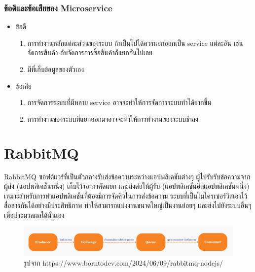 \subsubsection{ข้อดีและข้อเสียของ Microservice}
\begin{itemize}
  \item ข้อดี
  \begin{enumerate}
    \item การทำงานหลักแต่ละส่วนของระบบ ถ้าเป็นไปได้ควรแยกออกเป็น service แต่ละอัน เช่นจัดการสินค้า กับจัดการการซื้อสินค้าก็แยกกันไปเลย
    \item มีที่เก็บข้อมูลของตัวเอง
  \end{enumerate}
  \item ข้อเสีย
  \begin{enumerate}
    \item การจัดการระบบที่มีหลาย service อาจจะทำให้การจัดการระบบทำได้ยากขึ้น
    \item การทำงานของระบบที่แยกออกมาอาจจะทำให้การทำงานของระบบช้าลง
  \end{enumerate}
\end{itemize}
\clearpage
\section{RabbitMQ}
\hspace{1.27cm}RabbitMQ \cite{rabbitmq}ซอฟต์แวร์ที่เป็นตัวกลางรับส่งข้อความระหว่างแอปพลิเคชันต่างๆ ผู้ไปรับรับข้อความจากผู้ส่ง (แอปพลิเคชันหนึ่ง) เก็บไว้รอการคัดแยก และส่งต่อให้ผู้รับ (แอปพลิเคชันอีกแอปพลิเคชันหนึ่ง) เหมาะสำหรับการทำแอปพลิเคชันที่ต้องมีการจัดคิวในการส่งข้อความ ระบบที่เป็นไมโครเซอร์วิสเอาไว้สื่อสารกันได้อย่างมีประสิทธิภาพ ทำให้สามารถแบ่งงานขนาดใหญ่เป็นงานย่อยๆ และส่งไปยังระบบอื่นๆ เพื่อประมวลผลได้นั่นเอง
\begin{figure}[H] %
    \centering
    \includegraphics[width=\linewidth, keepaspectratio]{pictures/rabbitmq.png}
    \caption[Poem]{รูปจาก https://www.borntodev.com/2024/06/09/rabbitmq-nodejs/}
  \end{figure}
